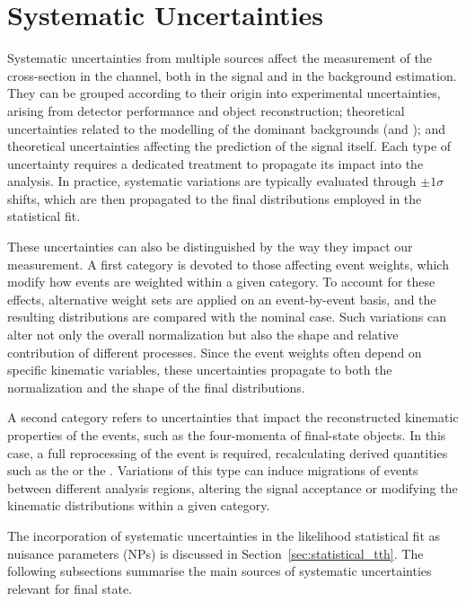 \section{Systematic Uncertainties}
\label{sec:tth_systematics}

Systematic uncertainties from multiple sources affect the measurement of the \ttH cross-section in the \tauhadhad channel, both in the signal and in the background estimation. They can be grouped according to their origin into experimental uncertainties, arising from detector performance and object reconstruction; theoretical uncertainties related to the modelling of the dominant backgrounds (\ttbar and \ztautau); and theoretical uncertainties affecting the prediction of the \ttH signal itself. Each type of uncertainty requires a dedicated treatment to propagate its impact into the analysis. 
In practice, systematic variations are typically evaluated through $\pm 1\sigma$ shifts, which are then propagated to the final distributions employed in the statistical fit.  

These uncertainties can also be distinguished by the way they impact our measurement. A first category is devoted to those affecting event weights, which modify how events are weighted within a given category. To account for these effects, alternative weight sets are applied on an event-by-event basis, and the resulting distributions are compared with the nominal case. Such variations can alter not only the overall normalization but also the shape and relative contribution of different processes. Since the event weights often depend on specific kinematic variables, these uncertainties propagate to both the normalization and the shape of the final distributions.  

A second category refers to uncertainties that impact the reconstructed kinematic properties of the events, such as the four-momenta of final-state objects. In this case, a full reprocessing of the event is required, recalculating derived quantities such as the \etmiss or the \mmc. Variations of this type can induce migrations of events between different analysis regions, altering the signal acceptance or modifying the kinematic distributions within a given category.  

The incorporation of systematic uncertainties in the likelihood statistical fit as nuisance parameters (NPs) is discussed in Section~\ref{sec:statistical_tth}. The following subsections summarise the main sources of systematic uncertainties relevant for \ttHtt final state.

